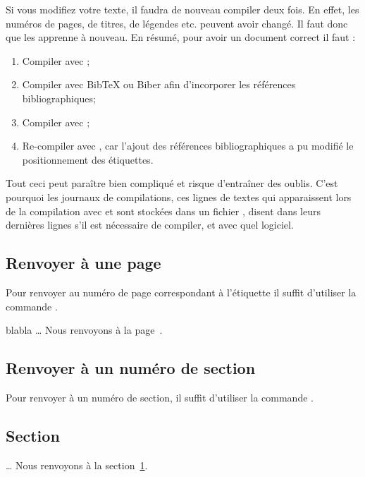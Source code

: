 \begin{attention}
	Si vous modifiez votre texte, il faudra de nouveau compiler deux fois. En effet, les numéros de pages, de titres, de légendes etc. peuvent avoir changé. Il faut donc  que \XeLaTeX{} les apprenne à nouveau. En résumé, pour avoir un document correct il faut :
	\begin{enumerate}
		\item Compiler avec \XeLaTeX{};
		\item Compiler avec BibTeX ou Biber afin d'incorporer les références bibliographiques;
		\item Compiler avec \XeLaTeX{};
		\item Re-compiler avec \XeLaTeX{}, car l'ajout des références bibliographiques a pu modifié le positionnement des étiquettes.
	\end{enumerate}
	
	Tout ceci peut paraître bien compliqué et risque d'entraîner des oublis. C'est pourquoi les journaux de compilations, ces lignes de textes qui apparaissent lors de la compilation avec \XeLaTeX{} et sont stockées dans un fichier , disent dans leurs dernières lignes s'il est nécessaire de compiler, et avec quel logiciel.
\end{attention}

\subsection{Renvoyer à une page}

Pour renvoyer au numéro de page correspondant à l'étiquette  il suffit d'utiliser la commande .

\begin{latexcode}
blabla \label{etiquette}
…
Nous renvoyons à la page~\pageref{etiquette}.
\end{latexcode}

\subsection{Renvoyer à un numéro de section}

Pour renvoyer à un numéro de section, il suffit d'utiliser la commande .

\begin{latexcode}
\section{Section} \label{etiquette}
…
Nous renvoyons à la section~\ref{etiquette}.
\end{latexcode}
 
